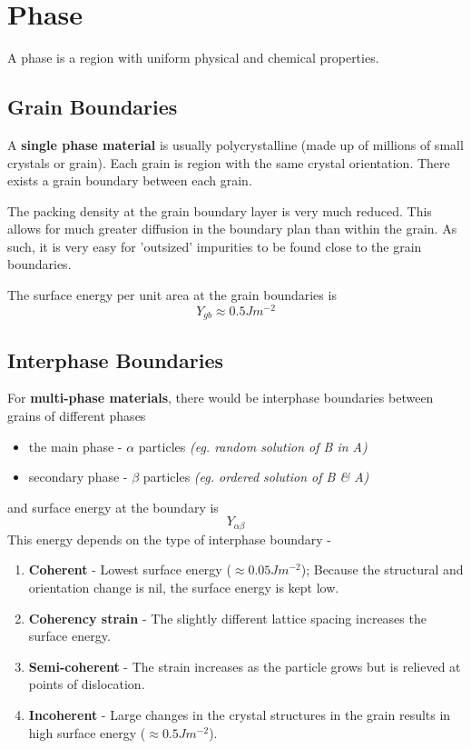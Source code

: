 \section{Phase} %
\label{sec:phase}
A phase is a region with uniform physical and chemical properties.

\subsection{Grain Boundaries} %
\label{sub:grain_boundaries}

A \textbf{single phase material} is usually polycrystalline (made up of millions of small crystals or grain). Each grain is region with the same crystal orientation. There exists a grain boundary between each grain.

The packing density at the grain boundary layer is very much reduced. This allows for much greater diffusion in the boundary plan than within the grain. As such, it is very easy for 'outsized' impurities to be found close to the grain boundaries.

The surface energy per unit area at the grain boundaries is
\begin{equation}
  Y_{gb} \approx 0.5 Jm^{-2}
\end{equation}

\subsection{Interphase Boundaries} %
\label{sub:interphase_boundaries}
For \textbf{multi-phase materials}, there would be interphase boundaries between grains of different phases
\begin{itemize}
  \item the main phase - $\alpha$ particles \emph{(eg. random solution of B in A)}
  \item secondary phase - $\beta$ particles \emph{(eg. ordered solution of B \& A)}
\end{itemize}
and surface energy at the boundary is 
\begin{equation}
  Y_{\alpha\beta}
\end{equation}
This energy depends on the type of interphase boundary -
\begin{enumerate}
  \item \textbf{Coherent} - Lowest surface energy ($\approx0.05Jm^{-2}$); Because the structural and orientation change is nil, the surface energy is kept low.
  \item \textbf{Coherency strain} - The slightly different lattice spacing increases the surface energy.
  \item \textbf{Semi-coherent} - The strain increases as the particle grows but is relieved at points of dislocation.
  \item \textbf{Incoherent} - Large changes in the crystal structures in the grain results in high surface energy ($\approx0.5Jm^{-2}$).
\end{enumerate}

